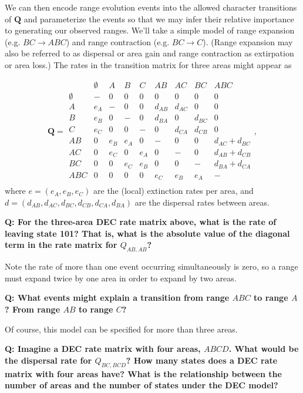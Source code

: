 We can then encode range evolution events into the allowed character transitions of $\textbf{Q}$ and parameterize the events so that we may infer their relative importance to generating our observed ranges.
We'll take a simple model of range expansion (e.g. $BC \rightarrow ABC$) and range contraction (e.g. $BC \rightarrow C$).
(Range expansion may also be referred to as dispersal or area gain and range contraction as extirpation or area loss.)
The rates in the transition matrix for three areas might appear as

\[
\textbf{Q} = 
	\begin{array}{c|cccccccc}
		& \emptyset & A & B & C & AB & AC & BC & ABC \\
		\hline
		\emptyset & - & 0 & 0 & 0 & 0 & 0 & 0 & 0 \\
		A & e_A & - & 0 & 0 & d_{AB} & d_{AC} & 0 & 0 \\
		B & e_B & 0 & - & 0 & d_{BA} & 0 & d_{BC} & 0 \\
		C & e_C & 0 & 0 & - & 0 & d_{CA} & d_{CB} & 0 \\
		AB & 0 & e_B & e_A & 0 & - & 0 & 0 & d_{AC} + d_{BC} \\
		AC & 0 & e_C & 0 & e_A & 0 & - & 0 & d_{AB} + d_{CB} \\
		BC & 0 & 0 & e_C & e_B & 0 & 0 & - & d_{BA} + d_{CA} \\
		ABC & 0 & 0 & 0 & 0 & e_C & e_B & e_A & - \\								
	\end{array},
\]
where $e = ( e_A, e_B, e_C )$ are the (local) extinction rates per area, and $d = ( d_{AB}, d_{AC}, d_{BC}, d_{CB}, d_{CA}, d_{BA})$ are the dispersal rates between areas.

{\bf Q: For the three-area DEC rate matrix above, what is the rate of leaving state 101? That is, what is the absolute value of the diagonal term in the rate matrix for $Q_{AB,AB}$? }

Note the rate of more than one event occurring simultaneously is zero, so a range must expand twice by one area in order to expand by two areas.

{\bf Q: What events might explain a transition from range $ABC$ to range $A$? From range $AB$ to range $C$?}

Of course, this model can be specified for more than three areas.

{ \bf Q: Imagine a DEC rate matrix with four areas, $ABCD$. What would be the dispersal rate for $Q_{BC,BCD}$? How many states does a DEC rate matrix with four areas have? What is the relationship between the number of areas and the number of states under the DEC model? }

